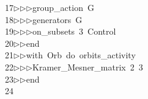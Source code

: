 \begin{tabbing}
17\>$\triangleright$\>$\triangleright$\>$\triangleright$\>group\_action\ G\ \\[0pt]
18\>$\triangleright$\>$\triangleright$\>$\triangleright$\>generators\ G\ \\[0pt]
19\>$\triangleright$\>$\triangleright$\>$\triangleright$\>on\_subsets\ 3\ Control\ \\[0pt]
20\>$\triangleright$\>$\triangleright$\>end\ \\[0pt]
21\>$\triangleright$\>$\triangleright$\>with\ Orb\ do\ orbits\_activity\ \\[0pt]
22\>$\triangleright$\>$\triangleright$\>$\triangleright$\>Kramer\_Mesner\_matrix\ 2\ 3\ \\[0pt]
23\>$\triangleright$\>$\triangleright$\>end\\[0pt]
24\>\end{tabbing}
